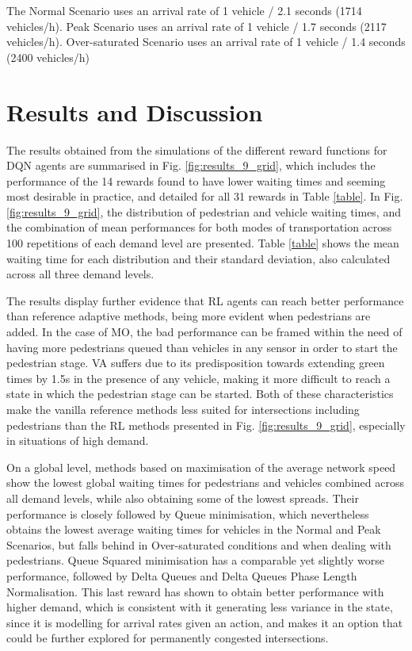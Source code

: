 \documentclass[conference]{IEEEtran}
\begin{document}
The Normal Scenario uses an arrival rate of 1 vehicle / 2.1 seconds (1714 vehicles/h). Peak Scenario uses an arrival rate of 1 vehicle / 1.7 seconds (2117 vehicles/h). Over-saturated Scenario uses an arrival rate of 1 vehicle / 1.4 seconds (2400 vehicles/h)


\section{Results and Discussion}
\label{results}
The results obtained from the simulations of the different reward functions for DQN agents are summarised in Fig. \ref{fig:results_9_grid}, which includes the performance of the 14 rewards found to have lower waiting times and seeming most desirable in practice, and detailed for all 31 rewards in Table \ref{table}.
In Fig. \ref{fig:results_9_grid}, the distribution of pedestrian and vehicle waiting times, and the combination of mean performances for both modes of transportation across 100 repetitions of each demand level are presented.
Table \ref{table} shows the mean waiting time for each distribution and their standard deviation, also calculated across all three demand levels. 

The results display further evidence that RL agents can reach better performance than reference adaptive methods, being more evident when pedestrians are added.
In the case of MO, the bad performance can be framed within the need of having more pedestrians queued than vehicles in any sensor in order to start the pedestrian stage.
VA suffers due to its predisposition towards extending green times by 1.5s in the presence of any vehicle, making it more difficult to reach a state in which the pedestrian stage can be started.
Both of these characteristics make the vanilla reference methods less suited for intersections including pedestrians than the RL methods presented in Fig. \ref{fig:results_9_grid}, especially in situations of high demand.

On a global level, methods based on maximisation of the average network speed show the lowest global waiting times for pedestrians and vehicles combined across all demand levels, while also obtaining some of the lowest spreads.
Their performance is closely followed by Queue minimisation, which nevertheless obtains the lowest average waiting times for vehicles in the Normal and Peak Scenarios, but falls behind in Over-saturated conditions and when dealing with pedestrians.
Queue Squared minimisation has a comparable yet slightly worse performance, followed by Delta Queues and Delta Queues Phase Length Normalisation.
This last reward has shown to obtain better performance with higher demand, which is consistent with it generating less variance in the state, since it is modelling for arrival rates given an action, and makes it an option that could be further explored for permanently congested intersections.
\end{document}
